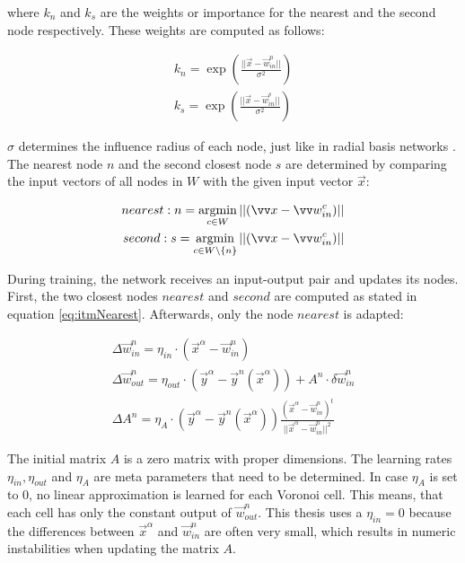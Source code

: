 where $k_n$ and $k_s$ are the weights or importance for the nearest and the second node respectively. These weights are computed as follows:

\begin{equation}
\begin{split}
k_n = \exp\left(\frac{||\vec{x}-\vec{w}^n_{in}||}{\sigma^2}\right) \\
k_s = \exp\left(\frac{||\vec{x}-\vec{w}^s_{in}||}{\sigma^2}\right) 
\end{split}
\end{equation}

$\sigma$ determines the influence radius of each node, just like in radial basis networks \cite{rbf}. The nearest node $n$ and the second closest node $s$ are determined by comparing the input vectors of all nodes in $W$ with the given input vector $\vec{x}$:

\begin{equation}
\begin{split}
	nearest: n = \argmin_{c\in W} ||(\vec{x} - \vec{w}^c_{in})|| \\
	second: s = \argmin_{c\in W\backslash\{n\}} ||(\vec{x} - \vec{w}^c_{in})||
\end{split}
\label{eq:itmNearest}
\end{equation}

During training, the network receives an input-output pair and updates its nodes. First, the two closest nodes $nearest$ and $second$ are computed as stated in equation \ref{eq:itmNearest}. Afterwards, only the node $nearest$ is adapted:

\begin{equation}
\begin{split}
\Delta \vec{w}^n_{in} = \eta_{in} \cdot (\vec{x}^\alpha - \vec{w}^n_{in}) \\
\Delta \vec{w}^n_{out} = \eta_{out} \cdot (\vec{y}^\alpha - \vec{y}^n(\vec{x}^\alpha)) + A^n \cdot \delta \vec{w}^n_{in} \\
\Delta A^n = \eta_A \cdot (\vec{y}^\alpha - \vec{y}^n(\vec{x}^\alpha)) \frac{(\vec{x}^\alpha - \vec{w}^n_{in})^t}{||\vec{x}^\alpha - \vec{w}^n_{in}||^2}
\end{split}
\end{equation}

The initial matrix $A$ is a zero matrix with proper dimensions. The learning rates $\eta_{in}, \eta_{out}$ and $\eta_A$ are meta parameters that need to be determined. In case $\eta_A$ is set to 0, no linear approximation is learned for each Voronoi cell. This means, that each cell has only the constant output of $\vec{w}^n_{out}$. This thesis uses a $\eta_{in} = 0$ because the differences between $\vec{x}^\alpha$ and  $\vec{w}^n_{in}$ are often very small, which results in numeric instabilities when updating the matrix $A$.

